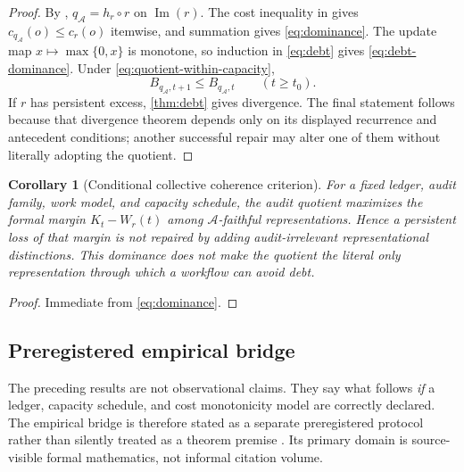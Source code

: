 \documentclass[11pt]{article}
\newcommand{\Img}{\operatorname{Im}}
\newcommand{\qA}{q_{\mathcal A}}
\newcommand{\mcA}{\mathcal A}
\newcommand{\Debt}{\ensuremath{B}}
\newcommand{\Demand}{\ensuremath{W}}
\newcommand{\AuditCap}{\ensuremath{K}}
\theoremstyle{plain}
\newtheorem{corollary}[theorem]{Corollary}
\theoremstyle{definition}
\theoremstyle{remark}
\begin{document}
\begin{proof}
By , $\qA=h_r\circ r$ on $\Img(r)$.  The cost inequality in
 gives $c_{\qA}(o)\leq c_r(o)$ itemwise, and summation gives
\eqref{eq:dominance}.  The update map
$x\mapsto\max\{0,x\}$ is monotone, so induction in \eqref{eq:debt} gives
\eqref{eq:debt-dominance}.  Under \eqref{eq:quotient-within-capacity},
\[
  \Debt_{\qA,t+1}\leq\Debt_{\qA,t}
  \qquad(t\geq t_0).
\]
If $r$ has persistent excess, \cref{thm:debt} gives divergence.  The final
statement follows because that divergence theorem depends only on its displayed
recurrence and antecedent conditions; another successful repair may alter one of
them without literally adopting the quotient.
\end{proof}

\begin{corollary}[Conditional collective coherence criterion]
\label{cor:collective}
For a fixed ledger, audit family, work model, and capacity schedule, the audit
quotient maximizes the formal margin $\AuditCap_t-\Demand_r(t)$ among
$\mcA$-faithful representations.  Hence a persistent loss of that margin is not
repaired by adding audit-irrelevant representational distinctions.  This
dominance does not make the quotient the literal only representation through
which a workflow can avoid debt.
\end{corollary}

\begin{proof}
Immediate from \eqref{eq:dominance}.
\end{proof}

\subsection{Preregistered empirical bridge}

The preceding results are not observational claims.  They say what follows
\emph{if} a ledger, capacity schedule, and cost monotonicity model are correctly
declared.  The empirical bridge is therefore stated as a separate preregistered
protocol rather than silently treated as a theorem premise
\cite{nosek2018}.  Its primary domain is source-visible formal mathematics,
not informal citation volume.
\end{document}
